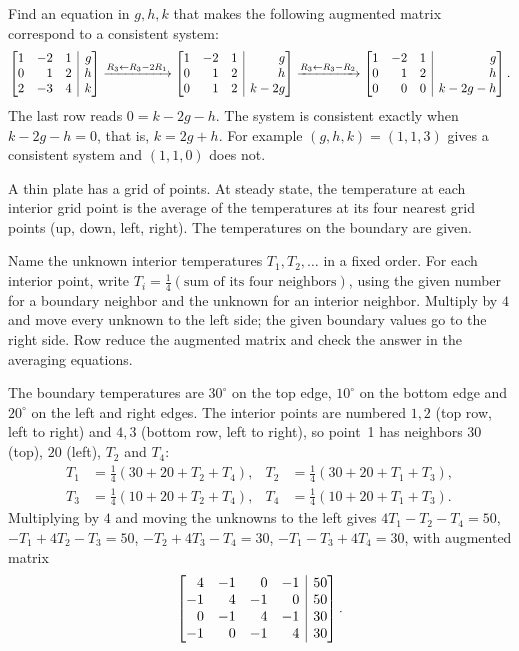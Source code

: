 \documentclass[10pt]{scrartcl}
\makeatletter
\newcommand{\aug}[2]{\left[\begin{array}{@{}#1@{}}#2\end{array}\right]}
\makeatother
\begin{document}
\begin{example*}
Find an equation in $g,h,k$ that makes the following augmented matrix correspond to a consistent system:
\[
  \aug{rrr|r}{1&-2&1&g\\0&1&2&h\\2&-3&4&k}
  \xrightarrow{R_3\leftarrow R_3-2R_1}
  \aug{rrr|r}{1&-2&1&g\\0&1&2&h\\0&1&2&k-2g}
  \xrightarrow{R_3\leftarrow R_3-R_2}
  \aug{rrr|r}{1&-2&1&g\\0&1&2&h\\0&0&0&k-2g-h}.
\]
The last row reads $0=k-2g-h$. The system is consistent exactly when $k-2g-h=0$, that is, $k=2g+h$. For example $(g,h,k)=(1,1,3)$ gives a consistent system and $(1,1,0)$ does not.
\end{example*}

A thin plate has a grid of points. At steady state, the temperature at each interior grid point is the average of the temperatures at its four nearest grid points (up, down, left, right). The temperatures on the boundary are given.
\begin{steps}
  \ii Name the unknown interior temperatures $T_1,T_2,\dots$ in a fixed order.
  \ii For each interior point, write $T_i=\frac14(\text{sum of its four neighbors})$, using the given number for a boundary neighbor and the unknown for an interior neighbor.
  \ii Multiply by $4$ and move every unknown to the left side; the given boundary values go to the right side.
  \ii Row reduce the augmented matrix and check the answer in the averaging equations.
\end{steps}

\begin{example*}
The boundary temperatures are $30^\circ$ on the top edge, $10^\circ$ on the bottom edge and $20^\circ$ on the left and right edges. The interior points are numbered $1,2$ (top row, left to right) and $4,3$ (bottom row, left to right), so point~1 has neighbors $30$ (top), $20$ (left), $T_2$ and $T_4$:
\[
  \begin{aligned}
    T_1&=\tfrac14(30+20+T_2+T_4), & T_2&=\tfrac14(30+20+T_1+T_3),\\
    T_3&=\tfrac14(10+20+T_2+T_4), & T_4&=\tfrac14(10+20+T_1+T_3).
  \end{aligned}
\]
Multiplying by $4$ and moving the unknowns to the left gives $4T_1-T_2-T_4=50$, $-T_1+4T_2-T_3=50$, $-T_2+4T_3-T_4=30$, $-T_1-T_3+4T_4=30$, with augmented matrix
\[
  \aug{rrrr|r}{4&-1&0&-1&50\\-1&4&-1&0&50\\0&-1&4&-1&30\\-1&0&-1&4&30}.
\]
\end{example*}
\end{document}
